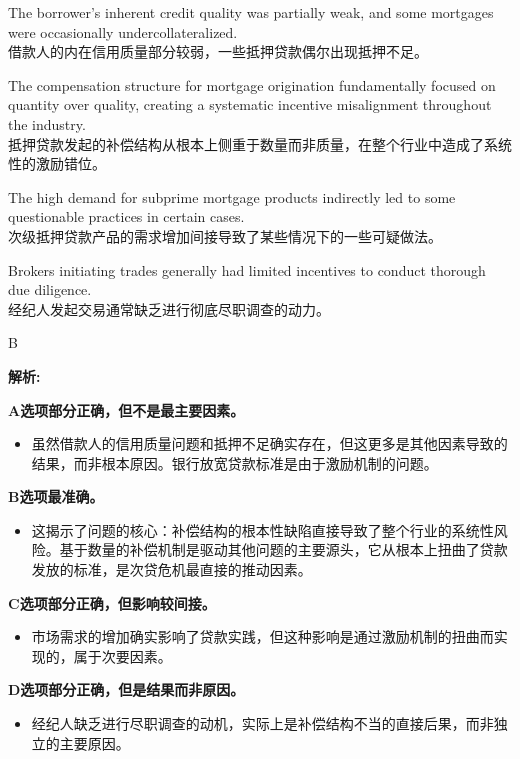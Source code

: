 \documentclass{article}
\newcounter{question} %
\newenvironment{explanation}
{\textbf{解析:}\par}
{\par}
\begin{document}
\begin{choices}
    \item The borrower's inherent credit quality was partially weak, and some mortgages were occasionally undercollateralized. \\
    借款人的内在信用质量部分较弱，一些抵押贷款偶尔出现抵押不足。
    \item The compensation structure for mortgage origination fundamentally focused on quantity over quality, creating a systematic incentive misalignment throughout the industry. \\
    抵押贷款发起的补偿结构从根本上侧重于数量而非质量，在整个行业中造成了系统性的激励错位。
    \item The high demand for subprime mortgage products indirectly led to some questionable practices in certain cases. \\
    次级抵押贷款产品的需求增加间接导致了某些情况下的一些可疑做法。
    \item Brokers initiating trades generally had limited incentives to conduct thorough due diligence. \\
    经纪人发起交易通常缺乏进行彻底尽职调查的动力。
\end{choices}

\begin{correctanswer}
    B
\end{correctanswer}

\begin{explanation}
    \textbf{A选项部分正确，但不是最主要因素。}
    \begin{itemize}
        \item 虽然借款人的信用质量问题和抵押不足确实存在，但这更多是其他因素导致的结果，而非根本原因。银行放宽贷款标准是由于激励机制的问题。
    \end{itemize}

    \textbf{B选项最准确。}
    \begin{itemize}
        \item 这揭示了问题的核心：补偿结构的根本性缺陷直接导致了整个行业的系统性风险。基于数量的补偿机制是驱动其他问题的主要源头，它从根本上扭曲了贷款发放的标准，是次贷危机最直接的推动因素。
    \end{itemize}

    \textbf{C选项部分正确，但影响较间接。}
    \begin{itemize}
        \item 市场需求的增加确实影响了贷款实践，但这种影响是通过激励机制的扭曲而实现的，属于次要因素。
    \end{itemize}

    \textbf{D选项部分正确，但是结果而非原因。}
    \begin{itemize}
        \item 经纪人缺乏进行尽职调查的动机，实际上是补偿结构不当的直接后果，而非独立的主要原因。
    \end{itemize}
\end{explanation}
\end{document}
